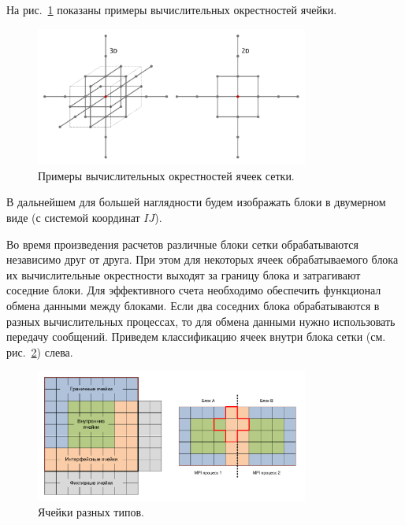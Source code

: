 На рис.~\ref{fig:text_2_block_cell_delta} показаны примеры вычислительных окрестностей ячейки.

\begin{figure}[ht]
\centering
\includegraphics[width=0.8\textwidth]{fig/par_3-cell-delta.pdf}
\singlespacing
{}\caption{Примеры вычислительных окрестностей ячеек сетки.}
\label{fig:text_2_block_cell_delta}
\end{figure}

В дальнейшем для большей наглядности будем изображать блоки в двумерном виде (с системой координат $IJ$).

Во время произведения расчетов различные блоки сетки обрабатываются независимо друг от друга.
При этом для некоторых ячеек обрабатываемого блока их вычислительные окрестности выходят за границу блока и затрагивают соседние блоки.
Для эффективного счета необходимо обеспечить функционал обмена данными между блоками.
Если два соседних блока обрабатываются в разных вычислительных процессах, то для обмена данными нужно использовать передачу сообщений.
Приведем классификацию ячеек внутри блока сетки (см. рис.~\ref{fig:text_2_block_block_cells}) слева.

\begin{figure}[ht]
\centering
\includegraphics[width=0.8\textwidth]{fig/par_4-block-cells.pdf}
\singlespacing
{}\caption{Ячейки разных типов.}
\label{fig:text_2_block_block_cells}
\end{figure}

